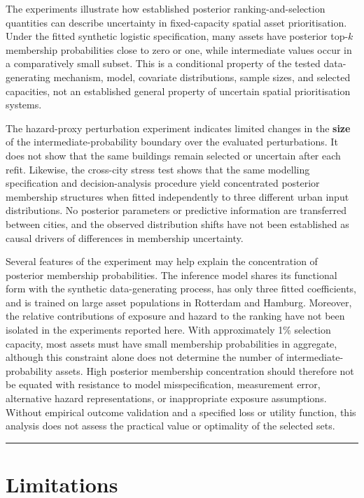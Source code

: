 \documentclass[
]{article}
\begin{document}
The experiments illustrate how established posterior
ranking-and-selection quantities can describe uncertainty in
fixed-capacity spatial asset prioritisation. Under the fitted synthetic
logistic specification, many assets have posterior top-\(k\) membership
probabilities close to zero or one, while intermediate values occur in a
comparatively small subset. This is a conditional property of the tested
data-generating mechanism, model, covariate distributions, sample sizes,
and selected capacities, not an established general property of
uncertain spatial prioritisation systems.

The hazard-proxy perturbation experiment indicates limited changes in
the \textbf{size} of the intermediate-probability boundary over the
evaluated perturbations. It does not show that the same buildings remain
selected or uncertain after each refit. Likewise, the cross-city stress
test shows that the same modelling specification and decision-analysis
procedure yield concentrated posterior membership structures when fitted
independently to three different urban input distributions. No posterior
parameters or predictive information are transferred between cities, and
the observed distribution shifts have not been established as causal
drivers of differences in membership uncertainty.

Several features of the experiment may help explain the concentration of
posterior membership probabilities. The inference model shares its
functional form with the synthetic data-generating process, has only
three fitted coefficients, and is trained on large asset populations in
Rotterdam and Hamburg. Moreover, the relative contributions of exposure
and hazard to the ranking have not been isolated in the experiments
reported here. With approximately 1\% selection capacity, most assets
must have small membership probabilities in aggregate, although this
constraint alone does not determine the number of
intermediate-probability assets. High posterior membership concentration
should therefore not be equated with resistance to model
misspecification, measurement error, alternative hazard representations,
or inappropriate exposure assumptions. Without empirical outcome
validation and a specified loss or utility function, this analysis does
not assess the practical value or optimality of the selected sets.

\begin{center}\rule{0.5\linewidth}{0.5pt}\end{center}

\section{Limitations}\label{limitations}
\end{document}
